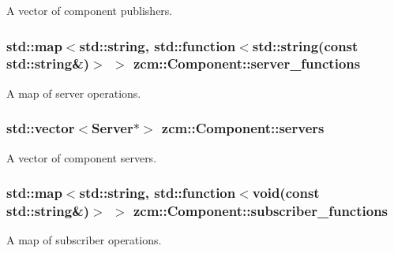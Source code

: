 A vector of component publishers. 

\subsubsection[{\texorpdfstring{server\+\_\+functions}{server_functions}}]{\setlength{\rightskip}{0pt plus 5cm}std\+::map$<$std\+::string, std\+::function$<$std\+::string(const std\+::string\&)$>$ $>$ zcm\+::\+Component\+::server\+\_\+functions}\hypertarget{classzcm_1_1Component_abae0d67e53de7447a2ade59f3ae40295}{}\label{classzcm_1_1Component_abae0d67e53de7447a2ade59f3ae40295}


A map of server operations. 

\subsubsection[{\texorpdfstring{servers}{servers}}]{\setlength{\rightskip}{0pt plus 5cm}std\+::vector$<${\bf Server}$\ast$$>$ zcm\+::\+Component\+::servers\hspace{0.3cm}{\ttfamily [protected]}}\hypertarget{classzcm_1_1Component_a1d99508f165f7014b190d2fbe4ad2271}{}\label{classzcm_1_1Component_a1d99508f165f7014b190d2fbe4ad2271}


A vector of component servers. 

\subsubsection[{\texorpdfstring{subscriber\+\_\+functions}{subscriber_functions}}]{\setlength{\rightskip}{0pt plus 5cm}std\+::map$<$std\+::string, std\+::function$<$void(const std\+::string\&)$>$ $>$ zcm\+::\+Component\+::subscriber\+\_\+functions}\hypertarget{classzcm_1_1Component_a1895703be210f0bd6558360575695147}{}\label{classzcm_1_1Component_a1895703be210f0bd6558360575695147}


A map of subscriber operations. 

